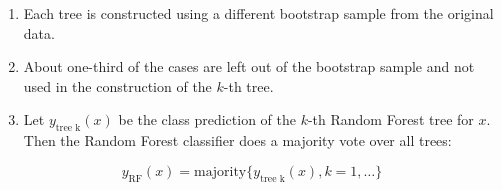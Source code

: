 \begin{enumerate}
\item Each tree is constructed using a different bootstrap sample from the original data. 
\item About one-third of the cases are left out of the bootstrap sample and not used in the construction of the $k$-th tree.
\item Let $y_{\text{tree k}}(x)$ be the class prediction of the $k$-th Random Forest tree for $x$. Then the Random Forest classifier does a majority vote over all trees:
\end{enumerate}

\[
y_{\text{RF}}(x) = \text{majority}\{y_{\text{tree k}}(x), k=1, \ldots\}
\]


